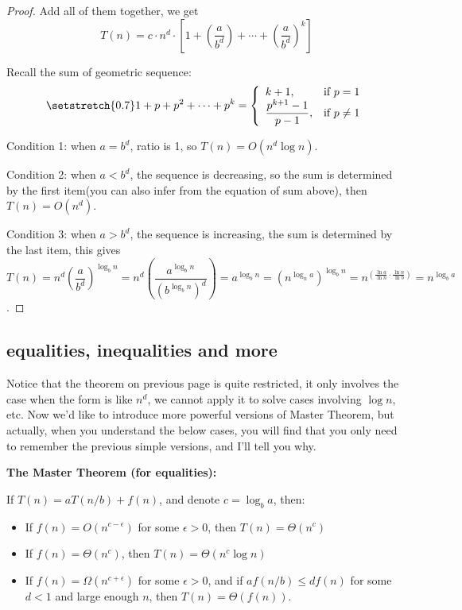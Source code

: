 \begin{spacing}{1.3}
\begin{proof}
    Add all of them together, we get 
    $$T(n)=c\cdot n^d\cdot \left[ 1+ \left(\dfrac{a}{b^d}\right)+\cdots + \left(\dfrac{a}{b^d}\right)^k\right]$$

    Recall the sum of geometric sequence:
    \begin{align*}
        \setstretch{0.7}
        1+p+p^2+\cdots +p^k=\left\{
        \begin{array}{ll}
            k+1, & \text{if } p=1\\
            \dfrac{p^{k+1}-1}{p-1}, & \text{if } p\ne 1
        \end{array}\right.
    \end{align*}

    Condition 1: when $a=b^d$, ratio is 1, so $T(n)=O(n^d\log n)$.

    Condition 2: when $a<b^d$, the sequence is decreasing, 
    so the sum is determined by the first item(you can also 
    infer from the equation of sum above), then $T(n)=O(n^d)$.

    Condition 3: when $a>b^d$, the sequence is increasing, 
    the sum is determined by the last item, this gives 
    $T(n)=n^{d}\left(\dfrac{a}{b^{d}}\right)^{\log _{b} n}=
    n^{d}\left(\dfrac{a^{\log _{b} n}}{\left(b^{\log _{b} n}\right)^{d}}\right)=
    a^{\log _{b} n}=
    \left(n^{\log_n{a}}\right)^{\log_b{n}}=
    n^{\left(\frac{\ln a}{\ln n}\cdot \frac{\ln n}{\ln b}\right)}=
    n^{\log _{b} a}$.
    \end{proof}

    \newpage
    \subsection{equalities, inequalities and more}

    Notice that the theorem on previous page is quite restricted, it only 
    involves the case when the form is like $n^d$, we cannot apply it 
    to solve cases involving $\log n$, etc. 
    Now we'd like to introduce more powerful versions of Master Theorem,
    but actually, when you understand the below cases, you will find that
    you only need to remember the previous simple versions, and I'll tell you why.


    \begin{theorem}
        {\bf The Master Theorem (for equalities):} 

        If $T(n)=aT(n/b)+f(n)$, and denote $c=\log_b a$, then:
        \begin{itemize}
            \item If $f(n)=O(n^{c-\epsilon})$ for some $\epsilon > 0$, then $T(n)=\Theta(n^c)$
            \item If $f(n)=\Theta(n^c)$, then $T(n)=\Theta(n^c\log n)$
            \item If $f(n)=\Omega(n^{c+\epsilon})$ for some $\epsilon > 0$, and if 
            $af(n/b)\le df(n)$ for some $d<1$ and large enough $n$, then $T(n)=\Theta(f(n))$.
        \end{itemize}
    \end{theorem}


\end{spacing}
